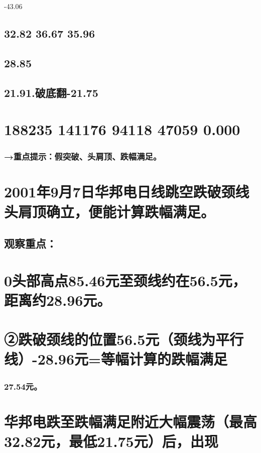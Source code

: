 \documentclass{article}
\begin{document}
-43.06

\subsection{32.82 36.67 35.96}

\subsection{28.85}

\subsection{21.91.破底翻-21.75}

\section{188235 141176 94118 47059 0.000}

\subsubsection{→重点提示：假突破、头肩顶、跌幅满足。}

\section{2001年9月7日华邦电日线跳空跌破颈线头肩顶确立，便能计算跌幅满足。}

\subsection{观察重点：}

\section{0头部高点85.46元至颈线约在56.5元，距离约28.96元。}

\section{②跌破颈线的位置56.5元（颈线为平行线）-28.96元=等幅计算的跌幅满足}

\subsubsection{27.54元。}

\section{华邦电跌至跌幅满足附近大幅震荡（最高32.82元，最低21.75元）后，出现}
\end{document}
